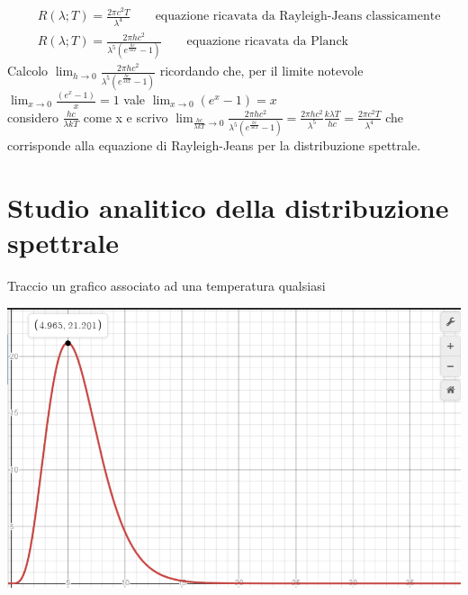 \documentclass{article}
\theoremstyle{definition}
\begin{document}
\begin{align*}
&R(\lambda ; T) = \frac{2\pi c^{2}T}{\lambda ^{4}} \qquad\text{equazione ricavata da Rayleigh-Jeans classicamente}\\
&R(\lambda;T) = \frac{2\pi h c^{2}}{\lambda^{5}\left ( e^{\frac{hc}{\lambda kT}}-1\right )} \qquad\text{equazione ricavata da Planck}
\end{align*}
Calcolo \(\lim_{h \rightarrow 0} \frac{2\pi h c^{2}}{\lambda^{5}\left ( e^{\frac{hc}{\lambda kT}}-1\right )}\) ricordando che, per il limite notevole \(\lim_{x\rightarrow 0}\frac{\left ( e^{x}-1\right )}{x}=1\) vale \(\lim_{x\rightarrow 0}\left ( e^{x}-1\right )=x\)\\
considero \(\frac{hc}{\lambda kT}\) come x e scrivo \(\lim_{\frac{hc}{\lambda kT} \rightarrow 0} \frac{2\pi h c^{2}}{\lambda^{5}\left ( e^{\frac{hc}{\lambda kT}}-1\right )} = \frac{2\pi h c^{2}}{\lambda^{5}} \frac{k\lambda T}{hc} = \frac{2\pi c^{2}T}{\lambda ^{4}}\) che corrisponde alla equazione di Rayleigh-Jeans per la distribuzione spettrale.

\newpage
\section*{Studio analitico della distribuzione spettrale}


Traccio un grafico associato ad una temperatura qualsiasi\\

\begin{minipage}{0.4\textwidth}
\includegraphics[width=\linewidth]{grafico1.png}
\end{minipage}
\end{document}
